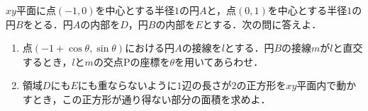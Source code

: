 $xy$平面に点$(-1,0)$を中心とする半径$1$の円$A$と，点$(0,1)$を中心とする半径$1$の円$B$をとる．円$A$の内部を$D$，円$B$の内部を$E$とする．次の問に答えよ．
\begin{enumerate}
  \item 点$(-1+\cos\theta,\sin\theta)$における円$A$の接線を$l$とする．円$B$の接線$m$が$l$と直交するとき，$l$と$m$の交点$\mathrm{P}$の座標を$\theta$を用いてあらわせ．
  \item 領域$D$にも$E$にも重ならないように$1$辺の長さが$2$の正方形を$xy$平面内で動かすとき，この正方形が通り得ない部分の面積を求めよ．
\end{enumerate}
